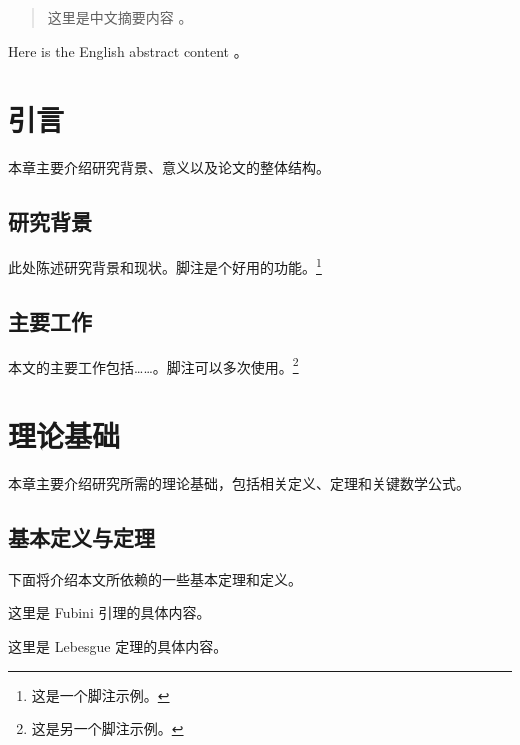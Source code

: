 \documentclass{sysuthesis}
\begin{document}
\maketitle
\frontmatter

\begin{abstract}
  这里是中文摘要内容 \cite{Knuth1984}。
\end{abstract}

\begin{abstract*}
  Here is the English abstract content \cite{Knuth1986}。
\end{abstract*}

\tableofcontents

\mainmatter

\chapter{引言}

本章主要介绍研究背景、意义以及论文的整体结构。

\section{研究背景}

此处陈述研究背景和现状。脚注是个好用的功能。\footnote{这是一个脚注示例。}

\section{主要工作}

本文的主要工作包括……。脚注可以多次使用。\footnote{这是另一个脚注示例。}

\chapter{理论基础}

本章主要介绍研究所需的理论基础，包括相关定义、定理和关键数学公式。

\section{基本定义与定理}

下面将介绍本文所依赖的一些基本定理和定义。

\begin{lemma}[Fubini] \label{lemma-Fubini}
  这里是 Fubini 引理的具体内容。
\end{lemma}

\begin{theorem}[Lebesgue] \label{thm-Lebesgue}
  这里是 Lebesgue 定理的具体内容。
\end{theorem}
\end{document}
